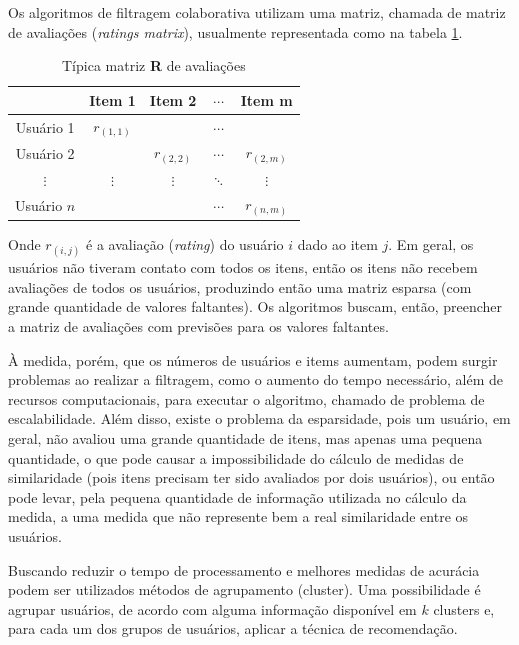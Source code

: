 \documentclass[12pt,a4paper,header]{abnt}
\begin{document}
Os algoritmos de filtragem colaborativa utilizam uma matriz, chamada de matriz de avaliações (\textit{ratings matrix}), usualmente representada como na tabela \ref{rating_matrix}.

\begin{table}[h]
\caption{Típica matriz \textbf{R} de avaliações}
\label{rating_matrix}
\centering
\begin{tabular}{@{}c|cccc@{}}
\cmidrule(l){2-5}
\textbf{}   & Item 1       & Item 2       & $\cdots$ & Item m       \\ \midrule
Usuário 1   & $r_{(1, 1)}$ &              & $\cdots$ &              \\
Usuário 2   &              & $r_{(2, 2)}$ & $\cdots$ & $r_{(2, m)}$ \\
$\vdots$    & $\vdots$     & $\vdots$     & $\ddots$ & $\vdots$     \\
Usuário $n$ &              &              & $\cdots$ & $r_{(n, m)}$ \\ \bottomrule
\end{tabular}
\end{table}

Onde $r_{(i, j)}$ é a avaliação (\textit{rating}) do usuário $i$ dado ao item $j$. Em geral, os usuários não tiveram contato com todos os itens, então os itens não recebem avaliações de todos os usuários, produzindo então uma matriz esparsa (com grande quantidade de valores faltantes). Os algoritmos buscam, então, preencher a matriz de avaliações com previsões para os valores faltantes.

À medida, porém, que os números de usuários e items aumentam, podem surgir problemas ao realizar a filtragem, como o aumento do tempo necessário, além de recursos computacionais, para executar o algoritmo, chamado de problema de escalabilidade\cite{dakhel2011new}. Além disso, existe o problema da esparsidade, pois um usuário, em geral, não avaliou uma grande quantidade de itens, mas apenas uma pequena quantidade, o que pode causar a impossibilidade do cálculo de medidas de similaridade (pois itens precisam ter sido avaliados por dois usuários), ou então pode levar, pela pequena quantidade de informação utilizada no cálculo da medida, a uma medida que não represente bem a real similaridade entre os usuários\cite{dakhel2011new}.

Buscando reduzir o tempo de processamento e melhores medidas de acurácia podem ser utilizados métodos de agrupamento (cluster)\cite{o1999clustering}. Uma possibilidade é agrupar usuários, de acordo com alguma informação disponível em $k$ clusters e, para cada um dos grupos de usuários, aplicar a técnica de recomendação.  
\end{document}
